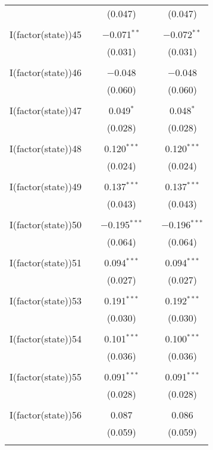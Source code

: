 \begin{table}[!htbp]
\begin{tabular}{@{\extracolsep{5pt}}lcccc}
  &  & (0.047) &  & (0.047) \\ 
  & & & & \\ 
 I(factor(state))45 &  & $-$0.071$^{**}$ &  & $-$0.072$^{**}$ \\ 
  &  & (0.031) &  & (0.031) \\ 
  & & & & \\ 
 I(factor(state))46 &  & $-$0.048 &  & $-$0.048 \\ 
  &  & (0.060) &  & (0.060) \\ 
  & & & & \\ 
 I(factor(state))47 &  & 0.049$^{*}$ &  & 0.048$^{*}$ \\ 
  &  & (0.028) &  & (0.028) \\ 
  & & & & \\ 
 I(factor(state))48 &  & 0.120$^{***}$ &  & 0.120$^{***}$ \\ 
  &  & (0.024) &  & (0.024) \\ 
  & & & & \\ 
 I(factor(state))49 &  & 0.137$^{***}$ &  & 0.137$^{***}$ \\ 
  &  & (0.043) &  & (0.043) \\ 
  & & & & \\ 
 I(factor(state))50 &  & $-$0.195$^{***}$ &  & $-$0.196$^{***}$ \\ 
  &  & (0.064) &  & (0.064) \\ 
  & & & & \\ 
 I(factor(state))51 &  & 0.094$^{***}$ &  & 0.094$^{***}$ \\ 
  &  & (0.027) &  & (0.027) \\ 
  & & & & \\ 
 I(factor(state))53 &  & 0.191$^{***}$ &  & 0.192$^{***}$ \\ 
  &  & (0.030) &  & (0.030) \\ 
  & & & & \\ 
 I(factor(state))54 &  & 0.101$^{***}$ &  & 0.100$^{***}$ \\ 
  &  & (0.036) &  & (0.036) \\ 
  & & & & \\ 
 I(factor(state))55 &  & 0.091$^{***}$ &  & 0.091$^{***}$ \\ 
  &  & (0.028) &  & (0.028) \\ 
  & & & & \\ 
 I(factor(state))56 &  & 0.087 &  & 0.086 \\ 
  &  & (0.059) &  & (0.059) \\ 
  & & & & \\ 

\end{tabular}
\end{table}
